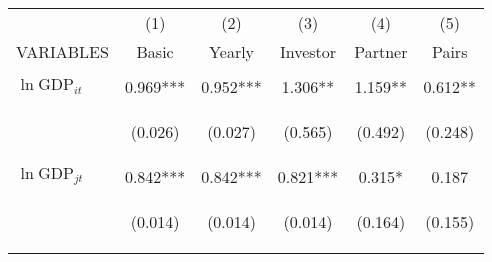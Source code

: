 \begin{center}
\begin{tabular}{lccccc} \hline
 & (1) & (2) & (3) & (4) & (5) \\
VARIABLES & Basic & Yearly & Investor & Partner & Pairs \\ \hline
\vspace{4pt} & \begin{footnotesize}\end{footnotesize} & \begin{footnotesize}\end{footnotesize} & \begin{footnotesize}\end{footnotesize} & \begin{footnotesize}\end{footnotesize} & \begin{footnotesize}\end{footnotesize} \\
$\ln\text{GDP}_{it}$ & 0.969*** & 0.952*** & 1.306** & 1.159** & 0.612** \\
\vspace{4pt} & \begin{footnotesize}(0.026)\end{footnotesize} & \begin{footnotesize}(0.027)\end{footnotesize} & \begin{footnotesize}(0.565)\end{footnotesize} & \begin{footnotesize}(0.492)\end{footnotesize} & \begin{footnotesize}(0.248)\end{footnotesize} \\
$\ln\text{GDP}_{jt}$ & 0.842*** & 0.842*** & 0.821*** & 0.315* & 0.187 \\
\vspace{4pt} & \begin{footnotesize}(0.014)\end{footnotesize} & \begin{footnotesize}(0.014)\end{footnotesize} & \begin{footnotesize}(0.014)\end{footnotesize} & \begin{footnotesize}(0.164)\end{footnotesize} & \begin{footnotesize}(0.155)\end{footnotesize} \\

\end{tabular}
\end{center}
